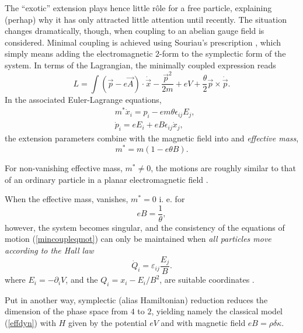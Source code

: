 \documentclass[a4paper,12pt]{article}
\newcommand{\vx}{{\vec x}}
\newcommand{\vp}{{\vec p}}
\newcommand{\vA}{{\vec A}}
\begin{document}
The ``exotic'' extension plays hence little r\^ole for a free
particle, explaining (perhap) why it has only attracted little 
attention until recently. 
The situation changes dramatically, though, when
coupling to an abelian gauge field is considered.
Minimal coupling is achieved using Souriau's prescription \cite{SSD},
which simply means adding the electromagnetic $2$-form
 to the symplectic form of the system.
In terms of the Lagrangian, the minimally coupled expression reads
\begin{equation}
    L=\int(\vp-e\vA)\cdot\dot{\vx}-\frac{\vp^2}{2m}
    +eV+\frac{\theta}{2}\vp\times\dot{\vp}.
\label{mincouplag}
\end{equation}
 In the associated Euler-Lagrange equations,
\begin{equation}
    \begin{array}{ll}
    &m^*\dot{x}_{i}=p_{i}-em\theta\epsilon_{ij}E_{j},
    \\[4pt]
    &\dot{p}_{i}=eE_{i}+eB\epsilon_{ij}\dot{x}_{j},
    \end{array}
\label{mincoupleqmot}
\end{equation}
the extension parameters combine with the magnetic field
into and {\it effective mass},
\begin{equation}
    m^*=m\left(1-e\theta B\right).
    \label{effmass}
\end{equation}

For non-vanishing effective mass, $m^*\neq0$,
the motions are roughly similar to that of an ordinary particle
in a planar electromagnetic field \cite{DJT}.

When the effective mass, vanishes, $m^*=0$ i. e. for
\begin{equation}
    eB=\frac{1}{\theta},
    \label{criticalcase}
\end{equation}    
however, the system becomes singular, and the
consistency of the equations of motion (\ref{mincoupleqmot}) can 
only be maintained when
{\it all particles move according to the  Hall law}
\begin{equation}
    \dot{Q}_{i}=\varepsilon_{ij}\frac{E_{j}}{B}.
\label{Hallaw}
\end{equation} 
where $E_{i}=-\partial_{i}V$, and the $Q_{i}=x_{i}-E_{i}/B^2$,  
are suitable coordinates \cite{DH}.

Put in another way, symplectic\cite{DH,SSD}
(alias Hamiltonian\cite{FaJa}) reduction reduces
 the dimension of the phase space from $4$ to 
$2$, yielding namely the   
classical model (\ref{effdyn})
with $H$ given by the potential $eV$ and with
magnetic field $eB=\rho\delta\kappa$. 
\end{document}
